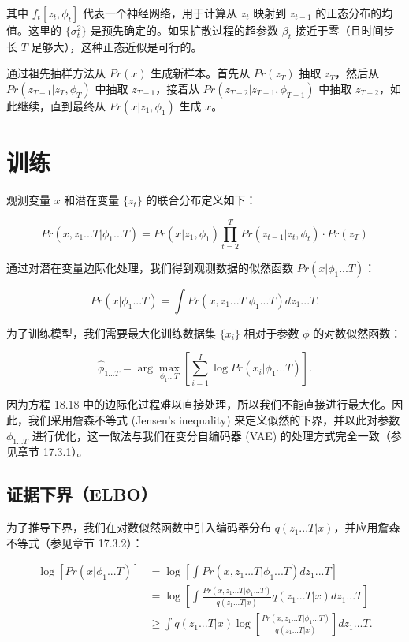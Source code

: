 其中 \(f_t[z_t, \phi_t]\) 代表一个神经网络，用于计算从 \(z_t\) 映射到 \(z_{t-1}\) 的正态分布的均值。这里的 \(\{\sigma_t^2\}\) 是预先确定的。如果扩散过程的超参数 \(\beta_t\) 接近于零（且时间步长 \(T\) 足够大），这种正态近似是可行的。

通过祖先抽样方法从 \(Pr(x)\) 生成新样本。首先从 \(Pr(z_T)\) 抽取 \(z_T\)，然后从 \(Pr(z_{T-1}|z_T, \phi_T)\) 中抽取 \(z_{T-1}\)，接着从 \(Pr(z_{T-2}|z_{T-1}, \phi_{T-1})\) 中抽取 \(z_{T-2}\)，如此继续，直到最终从 \(Pr(x|z_1, \phi_1)\) 生成 \(x\)。

\section{训练}
观测变量 \(x\) 和潜在变量 \(\{z_t\}\) 的联合分布定义如下：

\[
Pr(x, z_1...T|\phi_1...T) = Pr(x|z_1, \phi_1) \prod_{t=2}^{T} Pr(z_{t-1}|z_t, \phi_t) \cdot Pr(z_T) \tag{18.17}
\]

通过对潜在变量边际化处理，我们得到观测数据的似然函数 \(Pr(x|\phi_1...T)\)：

\[
Pr(x|\phi_1...T) = \int Pr(x, z_1...T|\phi_1...T)dz_1...T. \tag{18.18}
\]

为了训练模型，我们需要最大化训练数据集 \(\{x_i\}\) 相对于参数 \(\phi\) 的对数似然函数：

\[
\hat{\phi}_{1...T} = \arg\max_{\phi_1...T} \left[ \sum_{i=1}^{I} \log Pr(x_i|\phi_1...T) \right]. \tag{18.19}
\]

因为方程 18.18 中的边际化过程难以直接处理，所以我们不能直接进行最大化。因此，我们采用詹森不等式 (Jensen's inequality) 来定义似然的下界，并以此对参数 \(\phi_{1...T}\) 进行优化，这一做法与我们在变分自编码器 (VAE) 的处理方式完全一致（参见章节 17.3.1）。

\subsection{证据下界（ELBO）}
为了推导下界，我们在对数似然函数中引入编码器分布 \(q(z_1...T|x)\)，并应用詹森不等式（参见章节 17.3.2）：


\begin{align}
\log \left[ Pr(x|\phi_1...T) \right] &= \log \left[ \int Pr(x, z_1...T|\phi_1...T)dz_1...T \right] \\
&= \log \left[ \int \frac{Pr(x, z_1...T|\phi_1...T)}{q(z_1...T|x)} q(z_1...T|x) dz_1...T \right] \\
&\geq \int q(z_1...T|x) \log \left[ \frac{Pr(x, z_1...T|\phi_1...T)}{q(z_1...T|x)} \right] dz_1...T.
\end{align} 


